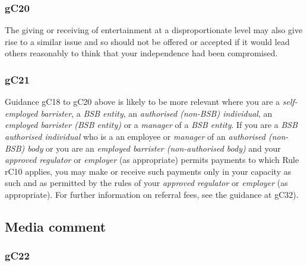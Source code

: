 \subsubsection{\color{darkgrey}gC20}

The giving or receiving of entertainment at a disproportionate level may
also give rise to a similar issue and so should not be offered or
accepted if it would lead others reasonably to think that your
independence had been compromised.

\subsubsection{\color{darkgrey}gC21}

Guidance gC18 to gC20 above is likely to be more relevant where you are
a \emph{self-employed barrister}, a \emph{BSB entity}, an
\emph{authorised (non-BSB) individual}, an \emph{employed barrister (BSB
entity)} or a \emph{manager} of a \emph{BSB entity}. If you are a
\emph{BSB authorised individual} who is a an employee or \emph{manager}
of an \emph{authorised (non-BSB) body} or you are an \emph{employed
barrister (non-authorised body)} and your \emph{approved regulator} or
\emph{employer} (as appropriate) permits payments to which Rule rC10
applies, you may make or receive such payments only in your capacity as
such and as permitted by the rules of your \emph{approved regulator} or
\emph{employer} (as appropriate). For further information on referral
fees, see the guidance at gC32).

\subsection{Media comment}

\subsubsection{\color{darkgrey}gC22}


